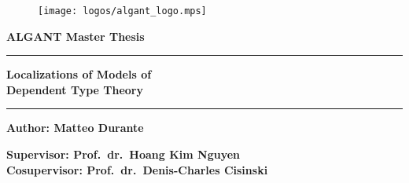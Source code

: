 \thispagestyle{empty}
\begin{titlepage}
  \begin{center}
    \begin{figure}[h!]
      \centering
      \texttt{[image: logos/algant\_logo.mps]}
    \end{figure}
    \vspace{0.4cm}
    \fontsize{15pt}{0.6cm}\selectfont
    {\textbf{ALGANT Master Thesis}}
    \vspace{0.2cm}
    \rule{\linewidth}{0.3mm}
    
    \vspace{0.05cm}
    \Huge{\textbf{Localizations of Models of
        \\ %
        Dependent Type Theory}}\\
    \vspace{0.05cm}
    
    \rule{\linewidth}{0.3mm}
    
    \vspace{1cm}
    
    \large{\textbf{Author: Matteo Durante}}\\
    \vspace{1cm}
    
    \large{\textbf{Supervisor: Prof.\ dr.\ Hoang Kim Nguyen}} \\
    \vspace{0.1cm}
    \large{\textbf{Cosupervisor: Prof.\ dr.\ Denis-Charles Cisinski}}
    
    \vfill
    

\end{center}
\end{titlepage}
